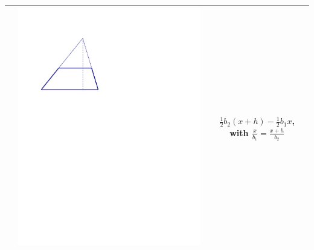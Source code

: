 \documentclass{ximera}
\begin{document}
{\begin{tabular}{|>{\centering\arraybackslash}m{2.5cm}|>{\centering\arraybackslash}m{9.5cm}|c|}
          & \includegraphics[scale=0.7]{./graphics/trapezoid6.pdf} &  $\frac{1}{2}b_2(x+h)-\frac{1}{2}b_1x$, with $\frac{x}{b_1}=\frac{x+h}{b_2}$ \\ \hline
\end{tabular}}
\end{document}
